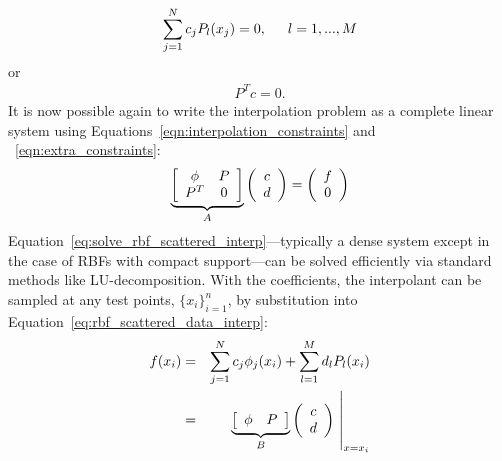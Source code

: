\documentclass[11pt]{report}
\begin{document}
{$$
\sum_{j=1}^{N} c_{j} P_l(x_j) = 0,  \hskip1.5em  l=1,..., M 
$$
or 
\begin{eqnarray}
P^T {c}  = {0}. 
\label{eqn:extra_constraints}
\end{eqnarray}
It is now possible again to write the interpolation problem as a complete linear system using Equations~\ref{eqn:interpolation_constraints} and ~\ref{eqn:extra_constraints}:%
\begin{eqnarray}
 \underbrace{\left[ \begin{array}{c c} 
	\phi & P \\
	P^T & 0
	\end{array} \right]}_{A} \left( \begin{array}{c}
							c \\
							d
							 \end{array}
						 \right) = \left( \begin{array}{c}
							f \\
							0
							 \end{array}
						 \right) \label{eq:solve_rbf_scattered_interp}
\end{eqnarray}
Equation~\ref{eq:solve_rbf_scattered_interp}---typically a dense system except in the case of RBFs with compact support---can be solved efficiently via standard methods like LU-decomposition.  With the coefficients, the interpolant can be sampled at any test points, $\{x_i\}_{i=1}^{n}$, by substitution into Equation~\ref{eq:rbf_scattered_data_interp}:
\begin{eqnarray}
f(x_i) & = & \sum_{j=1}^{N} c_{j}  \phi_j(x_i) +  \sum_{l=1}^{M} d_{l} P_l(x_i)  \nonumber \\
 & = & \left. \underbrace{\left[ \begin{array}{c c} 
       \phi &  P
	\end{array} \right]}_{B} 
	  \left( \begin{array}{cc}  c \\ d  \end{array} \right) \ \right|_{x={x_i}}
	\label{eqn:interpolate_x}
\end{eqnarray}


}
\end{document}

